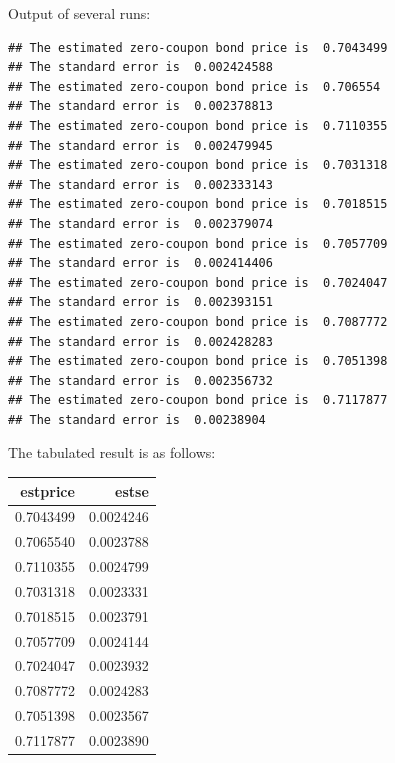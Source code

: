 Output of several runs:
\begin{knitrout}
\color{fgcolor}\begin{kframe}
\begin{verbatim}
## The estimated zero-coupon bond price is  0.7043499 
## The standard error is  0.002424588
## The estimated zero-coupon bond price is  0.706554 
## The standard error is  0.002378813
## The estimated zero-coupon bond price is  0.7110355 
## The standard error is  0.002479945
## The estimated zero-coupon bond price is  0.7031318 
## The standard error is  0.002333143
## The estimated zero-coupon bond price is  0.7018515 
## The standard error is  0.002379074
## The estimated zero-coupon bond price is  0.7057709 
## The standard error is  0.002414406
## The estimated zero-coupon bond price is  0.7024047 
## The standard error is  0.002393151
## The estimated zero-coupon bond price is  0.7087772 
## The standard error is  0.002428283
## The estimated zero-coupon bond price is  0.7051398 
## The standard error is  0.002356732
## The estimated zero-coupon bond price is  0.7117877 
## The standard error is  0.00238904
\end{verbatim}
\end{kframe}
\end{knitrout}
The tabulated result is as follows:\\
\begin{center}
\begin{knitrout}
\color{fgcolor}
\begin{tabular}{r|r}
\hline
estprice & estse\\
\hline
0.7043499 & 0.0024246\\
\hline
0.7065540 & 0.0023788\\
\hline
0.7110355 & 0.0024799\\
\hline
0.7031318 & 0.0023331\\
\hline
0.7018515 & 0.0023791\\
\hline
0.7057709 & 0.0024144\\
\hline
0.7024047 & 0.0023932\\
\hline
0.7087772 & 0.0024283\\
\hline
0.7051398 & 0.0023567\\
\hline
0.7117877 & 0.0023890\\
\hline
\end{tabular}


\end{knitrout}
\end{center}
